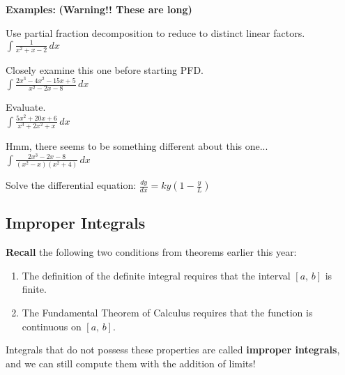 \documentclass[addpoints, 12pt]{exam}
\begin{document}
\textbf{Examples:} \textbf{(Warning!! These are long)}
\begin{questions}
    \question Use partial fraction decomposition to reduce to distinct linear factors.\\
    $\displaystyle\int\frac{1}{x^2+x-2}\,dx$
    
    \newpage
    
    \question Closely examine this one before starting PFD.\\
    $\displaystyle\int\frac{2x^3-4x^2-15x+5}{x^2-2x-8}\,dx$
    
    \newpage
    
    \question Evaluate.\\
    $\displaystyle\int\frac{5x^2+20x+6}{x^3+2x^2+x}\,dx$
    
    \newpage
    
    \question Hmm, there seems to be something different about this one...\\
    $\displaystyle\int\frac{2x^3-2x-8}{(x^2-x)(x^2+4)}\,dx$
    
    
    \question Solve the differential equation: $\displaystyle\frac{dy}{dx}=ky\left(1-\frac{y}{L}\right)$
    
\end{questions}



\newpage
{}
\subsection*{Improper Integrals}
\textbf{Recall} the following two conditions from theorems earlier this year:
\begin{enumerate}

    \item The definition of the definite integral requires that the interval $[a,\,b]$ is finite.
    \item The Fundamental Theorem of Calculus requires that the function is continuous on $[a,\,b]$.
\end{enumerate}
Integrals that do not possess these properties are called \textbf{improper integrals}, and we can still compute them with the addition of limits!
\end{document}
